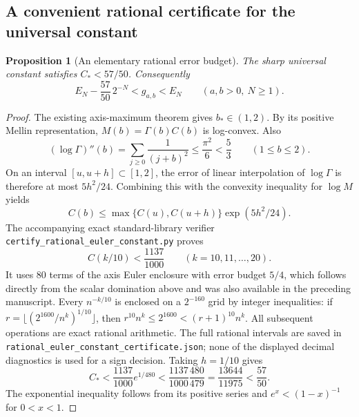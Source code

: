 \documentclass[11pt,letterpaper]{article}
\newtheorem{proposition}[theorem]{Proposition}
\theoremstyle{definition}
\theoremstyle{remark}
\begin{document}
\subsection{A convenient rational certificate for the universal constant}
\begin{proposition}[An elementary rational error budget]
\label{newEuler:prop:rational}
The sharp universal constant satisfies $C_*<57/50$. Consequently
\[
 E_N-\frac{57}{50}\,2^{-N}<g_{a,b}<E_N
 \qquad(a,b>0,\ N\ge1).
\]
\end{proposition}
\begin{proof}
The existing axis-maximum theorem gives $b_*\in(1,2)$. By its positive
Mellin representation, $M(b)=\Gamma(b)C(b)$ is log-convex. Also
\[
 (\log\Gamma)''(b)=\sum_{j\ge0}\frac1{(j+b)^2}
 \le\frac{\pi^2}{6}<\frac53\qquad(1\le b\le2).
\]
On an interval $[u,u+h]\subset[1,2]$, the error of linear
interpolation of $\log\Gamma$ is therefore at most $5h^2/24$.
Combining this with the convexity inequality for $\log M$ yields
\[
 C(b)\le\max\{C(u),C(u+h)\}\exp(5h^2/24).
\]
The accompanying exact standard-library verifier
\texttt{certify\_rational\_euler\_constant.py} proves
\[
 C(k/10)<\frac{1137}{1000}\qquad(k=10,11,\ldots,20).
\]
It uses 80 terms of the axis Euler enclosure with error
budget $5/4$, which follows directly from the scalar domination above
and was also available in the preceding manuscript. Every $n^{-k/10}$ is enclosed on a $2^{-160}$ grid
by integer inequalities: if
$r=\lfloor (2^{1600}/n^k)^{1/10}\rfloor$, then
$r^{10}n^k\le2^{1600}<(r+1)^{10}n^k$. All subsequent operations
are exact rational arithmetic. The full rational intervals are saved
in \texttt{rational\_euler\_constant\_certificate.json}; none of the
displayed decimal diagnostics is used for a sign decision.
Taking $h=1/10$ gives
\[
 C_*<\frac{1137}{1000}e^{1/480}
 <\frac{1137}{1000}\frac{480}{479}
 =\frac{13644}{11975}<\frac{57}{50}.
\]
The exponential inequality follows from its positive series and
$e^x<(1-x)^{-1}$ for $0<x<1$.
\end{proof}
\end{document}
